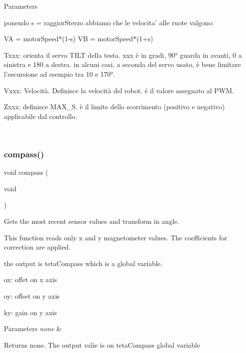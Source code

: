 \begin{DoxyParams}{Parameters}
\begin{DoxyVerb}
        ponendo s = raggiorSterzo abbiamo che le velocita' alle ruote valgono:

            VA = motorSpeed*(1-s)           
            VB = motorSpeed*(1+s)       

Txxx:   orienta il servo TILT della testa. xxx è in gradi, 90° guarda in avanti, 0 a sinistra e 180 a destra.
        in alcuni casi, a seconda del servo usato, è bene limitare l'escursione ad esempio tra 10 e 170°.

Vxxx:   Velocità. Definisce la velocità del robot. é il valore assegnato al PWM.    

Zxxx:   definisce MAX_S. è il limite dello scorrimento (positivo e negativo) applicabile dal controllo.\end{DoxyVerb}
 \\
\hline
\end{DoxyParams}
\mbox{\label{ari_pi__2_d_c__esp__08_8ino_ada2502f03f6e1fe62fef80b03f317b98}} 
\subsubsection{\texorpdfstring{compass()}{compass()}}
{\footnotesize\ttfamily void compass (\begin{DoxyParamCaption}\item[{void}]{ }\end{DoxyParamCaption})}



Gets the most recent sensor values and transform in angle. 

This function reads only x and y magnetometer values. The coefficients for correction are applied.

the output is teta\+Compass which is a global variable.

ox\+: offet on x axis

oy\+: offset on y axis

ky\+: gain on y axis


\begin{DoxyParams}{Parameters}
{\em none} & \\
\hline
\end{DoxyParams}
\begin{DoxyReturn}{Returns}
none. The output valie is on teta\+Compass global variable 
\end{DoxyReturn}
\mbox{\label{ari_pi__2_d_c__esp__08_8ino_a24f4d37ce4673eadaa4043cf6ecaff27}} 

